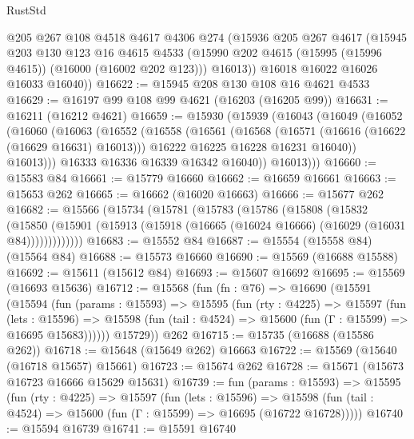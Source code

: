 \begin{lexlean}{RustStd}
\begin{coremodule}
        @205
        @267
        @108
        @4518
        @4617
        @4306
        @274
        (@15936
          @205
          @267
          @4617
          (@15945
            @203
            @130
            @123
            @16
            @4615
            @4533
            (@15990 @202 @4615 (@15995 (@15996 @4615)) (@16000 (@16002 @202 @123)))
            @16013))
        @16018
        @16022
        @16026
        @16033
        @16040))
@16622 := @15945 @208 @130 @108 @16 @4621 @4533
@16629 := @16197 @99 @108 @99 @4621 (@16203 (@16205 @99))
@16631 := @16211 (@16212 @4621)
@16659 := @15930
    (@15939
      (@16043
        (@16049
          (@16052
            (@16060
              (@16063
                (@16552
                  (@16558
                    (@16561
                      (@16568
                        (@16571 (@16616 (@16622 (@16629 @16631) @16013)))
                        @16222
                        @16225
                        @16228
                        @16231
                        @16040))
                    @16013)))
              @16333
              @16336
              @16339
              @16342
              @16040))
          @16013)))
@16660 := @15583 @84
@16661 := @15779 @16660
@16662 := @16659 @16661
@16663 := @15653 @262
@16665 := @16662 (@16020 @16663)
@16666 := @15677 @262
@16682 := @15566
    (@15734
      (@15781
        (@15783
          (@15786
            (@15808
              (@15832
                (@15850
                  (@15901 (@15913 (@15918 (@16665 (@16024 @16666) (@16029 (@16031 @84)))))))))))))
@16683 := @15552 @84
@16687 := @15554 (@15558 @84) (@15564 @84)
@16688 := @15573 @16660
@16690 := @15569 (@16688 @15588)
@16692 := @15611 (@15612 @84)
@16693 := @15607 @16692
@16695 := @15569 (@16693 @15636)
@16712 := @15568
    (fun (fn : @76) =>
    @16690
      (@15591
        (@15594
          (fun (params : @15593) =>
          @15595
            (fun (rty : @4225) =>
            @15597
              (fun (lets : @15596) =>
              @15598 (fun (tail : @4524) => @15600 (fun (Γ : @15599) => @16695 @15683))))))
        @15729))
    @262
@16715 := @15735 (@16688 (@15586 @262))
@16718 := @15648 (@15649 @262) @16663
@16722 := @15569 (@15640 (@16718 @15657) @15661)
@16723 := @15674 @262
@16728 := @15671 (@15673 @16723 @16666 @15629 @15631)
@16739 := fun (params : @15593) =>
  @15595
    (fun (rty : @4225) =>
    @15597
      (fun (lets : @15596) =>
      @15598 (fun (tail : @4524) => @15600 (fun (Γ : @15599) => @16695 (@16722 @16728)))))
@16740 := @15594 @16739
@16741 := @15591 @16740

\end{coremodule}
\end{lexlean}
